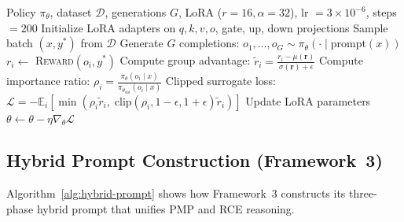 \documentclass{article} %
\begin{document}
\begin{algorithm}[htbp]
\caption{GRPO Training Loop}
\label{alg:grpo}
\begin{algorithmic}[1]
\REQUIRE Policy $\pi_\theta$, dataset $\mathcal{D}$, generations $G$, LoRA ($r\!=\!16, \alpha\!=\!32$), lr $= 3 \times 10^{-6}$, steps $= 200$
\STATE Initialize LoRA adapters on $q, k, v, o$, gate, up, down projections
    \STATE Sample batch $(x, y^*)$ from $\mathcal{D}$
    \STATE Generate $G$ completions: $o_1, \dots, o_G \sim \pi_\theta(\cdot \mid \text{prompt}(x))$
        \STATE $r_i \leftarrow$ \textsc{Reward}$(o_i, y^*)$ 
    \ENDFOR
    \STATE Compute group advantage: $\tilde{r}_i = \frac{r_i - \mu(\mathbf{r})}{\sigma(\mathbf{r}) + \epsilon}$
    \STATE Compute importance ratio: $\rho_i = \frac{\pi_\theta(o_i \mid x)}{\pi_{\theta_{\text{old}}}(o_i \mid x)}$
    \STATE Clipped surrogate loss:
    \STATE \quad $\mathcal{L} = -\mathbb{E}_i \left[\min\left(\rho_i \tilde{r}_i,\; \mathrm{clip}(\rho_i, 1-\epsilon, 1+\epsilon) \tilde{r}_i\right)\right]$
    \STATE Update LoRA parameters $\theta \leftarrow \theta - \eta \nabla_\theta \mathcal{L}$
\ENDFOR
\end{algorithmic}
\end{algorithm}

\subsection{Hybrid Prompt Construction (Framework~3)}

Algorithm~\ref{alg:hybrid-prompt} shows how Framework~3 constructs its three-phase hybrid prompt that unifies PMP and RCE reasoning.
\end{document}
